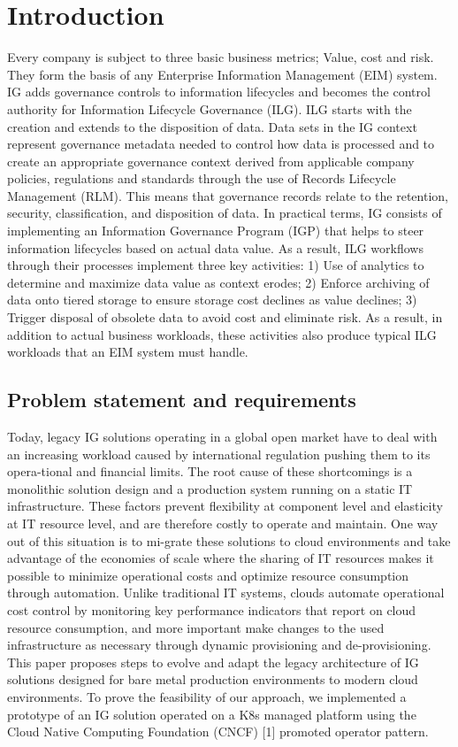 \documentclass[runningheads]{llncs}
\begin{document}
\section{Introduction}
Every company is subject to three basic business metrics; Value, cost and risk. They form the basis of any Enterprise Information Management (EIM) system. IG adds governance controls to information lifecycles and becomes the control authority for Information Lifecycle Governance (ILG).  ILG starts with the creation and extends to the disposition of data. Data sets in the IG context represent governance metadata needed to control how data is processed and to create an appropriate governance context derived from applicable company policies, regulations and standards through the use of Records Lifecycle Management (RLM). This means that governance records relate to the retention, security, classification, and disposition of data. In practical terms, IG consists of implementing an Information Governance Program (IGP) that helps to steer information lifecycles based on actual data value. As a result, ILG workflows through their processes implement three key activities: 1) Use of analytics to determine and maximize data value as context erodes; 2) Enforce archiving of data onto tiered storage to ensure storage cost declines as value declines; 3) Trigger disposal of obsolete data to avoid cost and eliminate risk. As a result, in addition to actual business workloads, these activities also produce typical ILG workloads that an EIM system must handle.

\subsection{Problem statement and requirements}
Today, legacy IG solutions operating in a global open market have to deal with an increasing workload caused by international regulation pushing them to its opera-tional and financial limits. The root cause of these shortcomings is a monolithic solution design and a production system running on a static IT infrastructure. These factors prevent flexibility at component level and elasticity at IT resource level, and are therefore costly to operate and maintain. One way out of this situation is to mi-grate these solutions to cloud environments and take advantage of the economies of scale where the sharing of IT resources makes it possible to minimize operational costs and optimize resource consumption through automation. Unlike traditional IT systems, clouds automate operational cost control by monitoring key performance indicators that report on cloud resource consumption, and more important make changes to the used infrastructure as necessary through dynamic provisioning and de-provisioning. 
This paper proposes steps to evolve and adapt the legacy architecture of IG solutions designed for bare metal production environments to modern cloud environments. To prove the feasibility of our approach, we implemented a prototype of an IG solution operated on a K8s managed platform using the Cloud Native Computing Foundation (CNCF) [1] promoted operator pattern.
%
\end{document}
